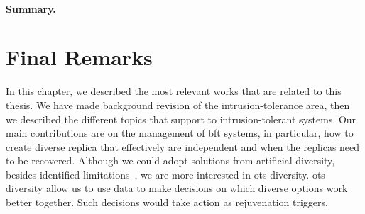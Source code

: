 \paragraph{Summary.}



\section{Final Remarks}
In this chapter, we described the most relevant works that are related to this thesis.
We have made background revision of the intrusion-tolerance area, then we described the different topics that support to intrusion-tolerant systems.
Our main contributions are on the management of \gls{bft} systems, in particular, how to create diverse replica that effectively are independent and when the replicas need to be recovered. 
Although we could adopt solutions from artificial diversity, besides identified limitations~\cite{Snow:2013,Bittau:2014}, we are more interested in \gls{ots} diversity.
\gls{ots} diversity allow us to use data to make decisions on which diverse options work better together.
Such decisions would take action as rejuvenation triggers. 









